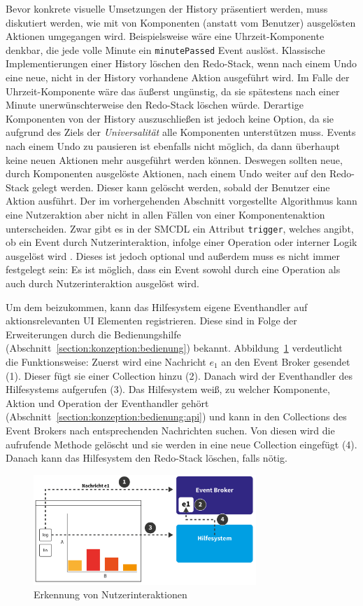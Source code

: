 \documentclass[
	headsepline,
	footsepline,
	fontsize=12pt,
	bibliography=totoc
]{scrbook}
\begin{document}
Bevor konkrete visuelle Umsetzungen der History präsentiert werden, muss diskutiert werden, wie mit von Komponenten (anstatt vom Benutzer) ausgelösten Aktionen umgegangen wird. Beispielsweise wäre eine Uhrzeit-Komponente denkbar, die jede volle Minute ein \texttt{minutePassed} Event auslöst. Klassische Implementierungen einer History löschen den Redo-Stack, wenn nach einem Undo eine neue, nicht in der History vorhandene Aktion ausgeführt wird. Im Falle der Uhrzeit-Komponente wäre das äußerst ungünstig, da sie spätestens nach einer Minute unerwünschterweise den Redo-Stack löschen würde. Derartige Komponenten von der History auszuschließen ist jedoch keine Option, da sie aufgrund des Ziels der \textit{Universalität} alle Komponenten unterstützen muss. Events nach einem Undo zu pausieren ist ebenfalls nicht möglich, da dann überhaupt keine neuen Aktionen mehr ausgeführt werden können. Deswegen sollten neue, durch Komponenten ausgelöste Aktionen, nach einem Undo weiter auf den Redo-Stack gelegt werden. Dieser kann gelöscht werden, sobald der Benutzer eine Aktion ausführt. Der im vorhergehenden Abschnitt vorgestellte Algorithmus kann eine Nutzeraktion aber nicht in allen Fällen von einer Komponentenaktion unterscheiden. Zwar gibt es in der SMCDL ein Attribut \texttt{trigger}, welches angibt, ob ein Event durch Nutzerinteraktion, infolge einer Operation oder interner Logik ausgelöst wird \cite[S. 98]{Pietschmann2012}. Dieses ist jedoch optional und außerdem muss es nicht immer festgelegt sein: Es ist möglich, dass ein Event sowohl durch eine Operation als auch durch Nutzerinteraktion ausgelöst wird.

Um dem beizukommen, kann das Hilfesystem eigene Eventhandler auf aktionsrelevanten UI Elementen registrieren. Diese sind in Folge der Erweiterungen durch die Bedienungshilfe (Abschnitt~\ref{section:konzeption:bedienung}) bekannt. Abbildung~\ref{figure:undo-ablauf} verdeutlicht die Funktionsweise: Zuerst wird eine Nachricht $e_1$ an den Event Broker gesendet (1). Dieser fügt sie einer Collection hinzu (2). Danach wird der Eventhandler des Hilfesystems aufgerufen (3). Das Hilfesystem weiß, zu welcher Komponente, Aktion und Operation der Eventhandler gehört (Abschnitt~\ref{section:konzeption:bedienung:api}) und kann in den Collections des Event Brokers nach entsprechenden Nachrichten suchen. Von diesen wird die aufrufende Methode gelöscht und sie werden in eine neue Collection eingefügt (4). Danach kann das Hilfesystem den Redo-Stack löschen, falls nötig.

\begin{figure}[htbp]
   \centering
   \includegraphics[width=0.75\textwidth]{images/konzeption-undo-ablauf.png}
   \caption{Erkennung von Nutzerinteraktionen}
   \label{figure:undo-ablauf}
\end{figure}
\end{document}

